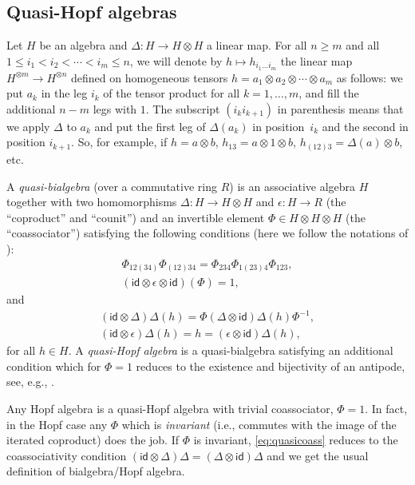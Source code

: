 \documentclass[pdftex]{sigma}
\numberwithin{equation}{section}
\theoremstyle{definition}
\newcommand{\id}{\mathsf{id}}
\begin{document}
\subsection{Quasi-Hopf algebras}\label{sec:2.2}

Let $H$ be an algebra and $\Delta\colon H\to H\otimes H$ a linear map.
For all $n\geq m$ and all $1\leq i_1<i_2<\cdots<i_m\leq n$, we will denote by $h\mapsto h_{i_1\ldots i_m}$ the
linear map $H^{\otimes m}\to H^{\otimes n}$ def\/ined on homogeneous tensors
$h=a_1\otimes a_2 \otimes\cdots\otimes a_m$ as follows: we put $a_k$ in the leg
$i_k$ of the tensor product for all $k=1,\ldots, m$, and f\/ill the additional
$n-m$ legs with $1$. The subscript $(i_ki_{k+1})$ in parenthesis means
that we apply $\Delta$ to $a_k$ and put the f\/irst leg of $\Delta(a_k)$ in position~$i_k$ and the second in position $i_{k+1}$.
So, for example, if $h=a\otimes b$, $h_{13}=a\otimes 1\otimes b$,
$h_{(12)3}=\Delta(a)\otimes b$, etc.

A \emph{quasi-bialgebra} (over a commutative ring $R$) is an associative algebra $H$ together with two homomorphisms $\Delta\colon H\to H\otimes H$ and $\epsilon\colon H\to R$ (the ``coproduct'' and ``counit'') and an invertible element $\Phi\in H\otimes H\otimes H$ (the ``coassociator'') satisfying the following conditions (here we follow the notations of \cite{Dri90,Dri91}):
\begin{gather}
\Phi_{12(34)}\Phi_{(12)34} = \Phi_{234}\Phi_{1(23)4}\Phi_{123} ,\label{eq:pent} \\
(\id\otimes\epsilon\otimes\id )(\Phi)=1 ,\label{eq:counitality}
\end{gather}
and
\begin{gather}
(\id\otimes\Delta)\Delta(h) =\Phi
(\Delta\otimes\id)\Delta(h)\Phi^{-1} , \label{eq:quasicoass} \\
(\id\otimes\epsilon)\Delta(h) =h=(\epsilon\otimes\id)\Delta(h) ,\nonumber
\end{gather}
for all $h\in H$.
A \emph{quasi-Hopf algebra} is a quasi-bialgebra satisfying an additional condition which for $\Phi=1$ reduces to the existence and bijectivity of an antipode, see, e.g., \cite[Def\/inition~16.1.1]{CP94}.

Any Hopf algebra is a quasi-Hopf algebra with trivial coassociator, $\Phi=1$. In fact, in the Hopf case any $\Phi$ which is \emph{invariant} (i.e., commutes with the image of the iterated coproduct) does the job. If $\Phi$ is invariant,
\eqref{eq:quasicoass} reduces to the coassociativity condition $(\id\otimes\Delta)\Delta=(\Delta\otimes\id)\Delta$ and we get the usual def\/inition of bialgebra/Hopf algebra.
\end{document}
